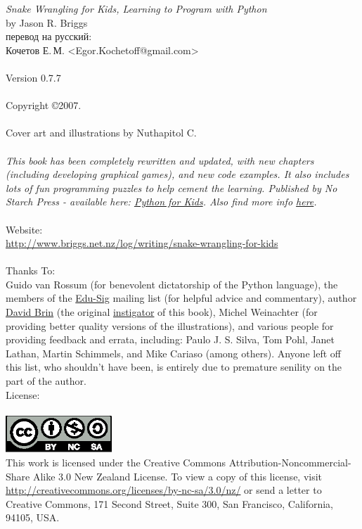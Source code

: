 \noindent
\textsf{\emph{Snake Wrangling for Kids, Learning to Program with Python}}\\
by Jason R. Briggs\\
перевод на русский:\\
Кочетов Е.\,М. <Egor.Kochetoff@gmail.com>\\
\\
Version 0.7.7
\\\\
Copyright \copyright 2007.\\
\\
Cover art and illustrations by Nuthapitol C.\\
\\
\noindent
\textsf{\emph{This book has been completely rewritten and updated, with new chapters (including developing graphical games), and new code examples. It also includes lots of fun programming puzzles to help cement the learning. Published by No Starch Press - available here: \href{http://nostarch.com/pythonforkids}{Python for Kids}. Also find more info \href{http://jasonrbriggs.com/python-for-kids/}{here}.}}
\\
\\
\linebreak
\noindent
Website:\\ \href{http://www.briggs.net.nz/log/writing/snake-wrangling-for-kids}{http://www.briggs.net.nz/log/writing/snake-wrangling-for-kids}\\ 
\\
\noindent
Thanks To:\\
Guido van Rossum (for benevolent dictatorship of the Python language), the members of the \href{http://www.python.org/community/sigs/current/edu-sig/}{Edu-Sig} mailing list (for helpful advice and commentary), author \href{http://www.davidbrin.com/}{David Brin} (the original \href{http://www.salon.com/tech/feature/2006/09/14/basic/}{instigator} of this book), Michel Weinachter (for providing better quality versions of the illustrations), and various people for providing feedback and errata, including: Paulo J. S. Silva, Tom Pohl, Janet Lathan, Martin Schimmels, and Mike Cariaso (among others).  Anyone left off this list, who shouldn't have been, is entirely due to premature senility on the part of the author.\\

\noindent
License:\\
\\
\includegraphics[width=40mm]{../en/by-nc-sa.eps}\\
This work is licensed under the Creative Commons Attribution-Noncommercial-Share Alike 3.0 New Zealand License. To view a copy of this license, visit\\ \href{http://creativecommons.org/licenses/by-nc-sa/3.0/nz/}{http://creativecommons.org/licenses/by-nc-sa/3.0/nz/} or send a letter to Creative Commons, 171 Second Street, Suite 300, San Francisco, California, 94105, USA.\\

